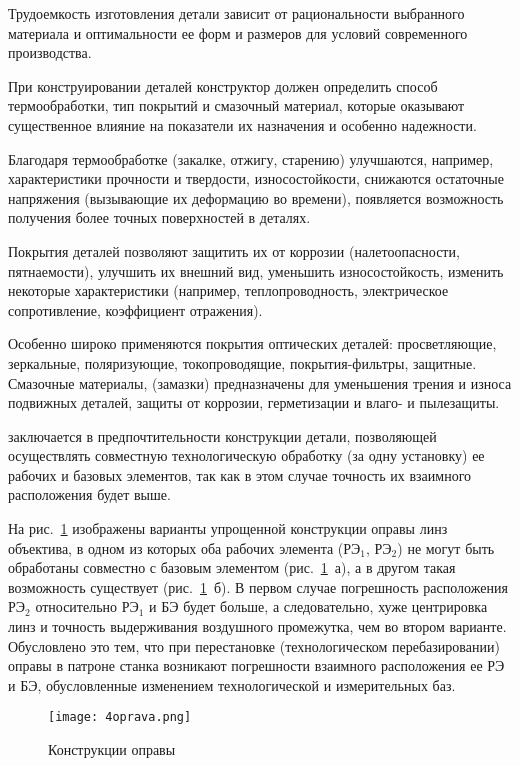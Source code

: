 Трудоемкость изготовления детали зависит от рациональности выбранного материала и оптимальности ее форм и размеров для условий современного производства. 

При конструировании деталей конструктор должен определить способ термообработки, тип покрытий и смазочный материал, которые оказывают существенное влияние на показатели их назначения и особенно надежности.

Благодаря термообработке (закалке, отжигу, старению) улучшаются, например, характеристики прочности и твердости, износостойкости, снижаются остаточные напряжения (вызывающие их деформацию во времени), появляется возможность получения более точных поверхностей в деталях.

Покрытия деталей позволяют защитить их от коррозии (налетоопасности, пятнаемости), улучшить их внешний вид, уменьшить износостойкость, изменить некоторые характеристики (например, теплопроводность, электрическое сопротивление, коэффициент отражения).

Особенно широко применяются покрытия оптических деталей: просветляющие, зеркальные, поляризующие, токопроводящие, покрытия-фильтры, защитные.
Смазочные материалы, (замазки) предназначены для уменьшения трения и износа подвижных деталей, защиты от коррозии, герметизации и влаго- и пылезащиты.

 заключается в предпочтительности конструкции детали, позволяющей осуществлять совместную технологическую обработку (за одну установку) ее рабочих и базовых элементов, так как в этом случае точность их взаимного расположения будет выше.

На рис.~\ref{pic:4oprava} изображены варианты упрощенной конструкции оправы линз объектива, в одном из которых оба рабочих элемента (РЭ$ _1 $, РЭ$ _2 $) не могут быть обработаны совместно с базовым элементом (рис.~\ref{pic:4oprava}~а), а в другом такая возможность существует (рис.~\ref{pic:4oprava}~б). В первом случае погрешность расположения РЭ$ _2 $ относительно РЭ$ _1 $ и БЭ будет больше, а следовательно, хуже центрировка линз и точность выдерживания воздушного промежутка, чем во втором варианте. Обусловлено это тем, что при перестановке (технологическом перебазировании) оправы в патроне станка возникают погрешности взаимного расположения ее РЭ и БЭ, обусловленные изменением технологической и измерительных баз.

\begin{figure}[h!]
	\begin{center}
		\caption{Конструкции оправы}
		\texttt{[image: 4oprava.png]}
		\label{pic:4oprava}
	\end{center}
\end{figure}

